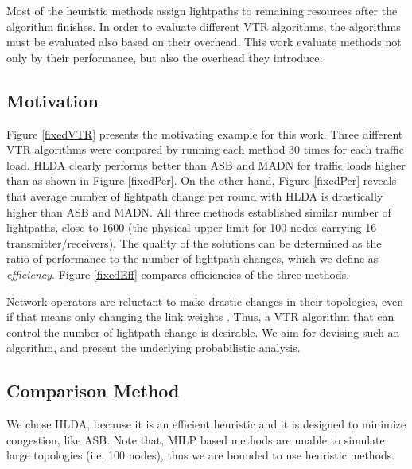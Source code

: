 \documentclass[conference]{IEEEtran}
\begin{document}
 Most of the heuristic methods assign lightpaths to remaining resources
 after the algorithm finishes.
In order to evaluate different VTR algorithms, the algorithms must be evaluated also based on their overhead.
This work evaluate methods not only by their performance, but also the overhead they introduce. 

 \subsection{Motivation}
Figure \ref{fixedVTR} presents the motivating example for this work. 
Three different VTR algorithms were compared by running each method 30 times for each traffic load.
 HLDA clearly performs better than  ASB and  MADN
 for traffic loads higher than  as shown in Figure \ref{fixedPer}.
 On the other hand, Figure \ref{fixedPer} reveals that average number of lightpath change 
 per round with HLDA is drastically higher than ASB and MADN. 
 All three methods  established similar number of lightpaths, close to 1600 (the physical upper limit for 100 nodes carrying 16 transmitter/receivers).
 The quality of the solutions can be determined as the ratio of performance  to the number of lightpath changes, which we define as {\em efficiency}.
 Figure \ref{fixedEff} compares efficiencies of the three methods.
 
 Network operators are reluctant to make drastic  changes in their topologies, even if that means only changing the link weights \cite{Fortz:OOW02}.
 Thus, a VTR algorithm that can control the number of lightpath change is desirable. We aim for devising such an algorithm, and present the underlying probabilistic analysis.
 
 \begin{figure*}[th]
\centering
\def\mywidth{0.29}
  \hfil
    \hfil {} 
\caption{ The performance comparison of various VTR algorithms.}
   \label{fixedVTR}
 \end{figure*} 
 
\subsection{Comparison Method}
We chose HLDA, because it is an efficient heuristic and it is designed to minimize congestion, like ASB.
Note that, MILP based methods are unable to simulate large topologies (i.e. 100 nodes), thus we are bounded to use heuristic
methods.
\end{document}

